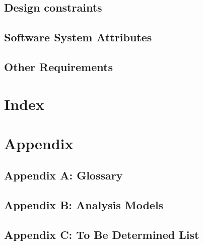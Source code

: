 \documentclass[compsoc,draftclsnofoot,onecolumn,10pt]{IEEEtran}
\begin{document}
\subsection{Design constraints}

\subsection{Software System Attributes}

\subsection{Other Requirements}

\section{Index}

\section{Appendix}

\subsection{Appendix A: Glossary}

\subsection{Appendix B: Analysis Models}

\subsection{Appendix C: To Be Determined List}
\end{document}
